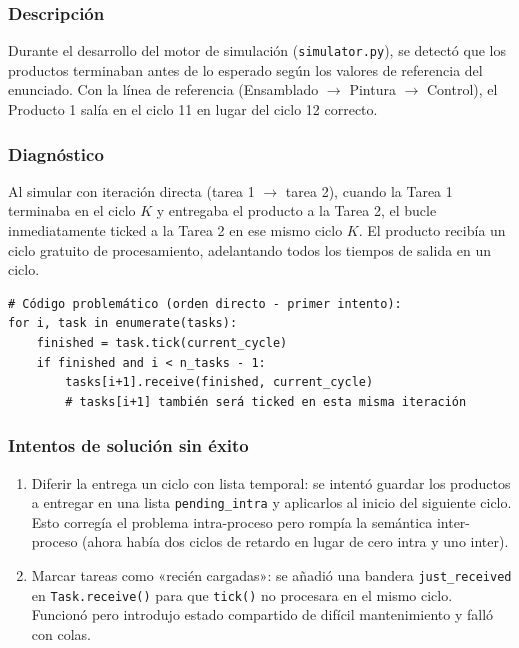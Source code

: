 \documentclass[12pt,letterpaper]{article}
\begin{document}
\subsubsection*{Descripción}

Durante el desarrollo del motor de simulación (\texttt{simulator.py}), se detectó que
los productos terminaban antes de lo esperado según los valores de referencia del enunciado.
Con la línea de referencia (Ensamblado $\to$ Pintura $\to$ Control), el Producto 1 salía en
el ciclo 11 en lugar del ciclo 12 correcto.

\subsubsection*{Diagnóstico}

Al simular con iteración directa (tarea 1 $\to$ tarea 2), cuando la Tarea 1 terminaba en el
ciclo $K$ y entregaba el producto a la Tarea 2, el bucle inmediatamente ticked a la Tarea 2
en ese mismo ciclo $K$. El producto recibía un ciclo gratuito de procesamiento, adelantando
todos los tiempos de salida en un ciclo.

\begin{lstlisting}
# Código problemático (orden directo - primer intento):
for i, task in enumerate(tasks):
    finished = task.tick(current_cycle)
    if finished and i < n_tasks - 1:
        tasks[i+1].receive(finished, current_cycle)
        # tasks[i+1] también será ticked en esta misma iteración
\end{lstlisting}

\subsubsection*{Intentos de solución sin éxito}

\begin{enumerate}[leftmargin=2em]
  \item Diferir la entrega un ciclo con lista temporal: se intentó guardar los
    productos a entregar en una lista \texttt{pending\_intra} y aplicarlos al inicio del
    siguiente ciclo. Esto corregía el problema intra-proceso pero rompía la semántica
    inter-proceso (ahora había dos ciclos de retardo en lugar de cero intra y uno inter).
  \item Marcar tareas como «recién cargadas»: se añadió una bandera \texttt{just\_received}
    en \texttt{Task.receive()} para que \texttt{tick()} no procesara en el mismo ciclo.
    Funcionó pero introdujo estado compartido de difícil mantenimiento y falló con colas.
\end{enumerate}
\end{document}
